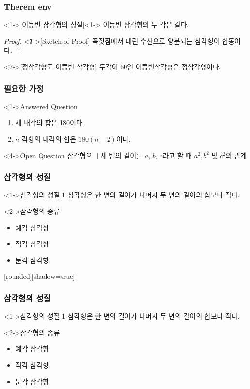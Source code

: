 \documentclass[xcolor=table]{beamer}
\begin{document}
\begin{frame}
\frametitle{Therem env}
\begin{theorem}<1->[이등변 삼각형의 성질]<1->
이등변 삼각형의 두 각은 같다.
\end{theorem}
\begin{proof}<3->[Sketch of Proof]
꼭짓점에서 내린 수선으로 양분되는 삼각형이 합동이다.
\end{proof}
\begin{example}<2->[정삼각형도 이등변 삼각형]
두각이 60인 이등변삼각형은 정삼각형이다.
\end{example}
\end{frame}

\begin{frame}
\frametitle{필요한 가정}
\begin{block}<1->{Answered Question}
\begin{enumerate}
\item<2-> 세 내각의 합은 180이다.
\item<3-> $n$ 각형의 내각의 합은 $180(n-2)$이다.
\end{enumerate}
\end{block}

\begin{block}<4->{Open Question}
삼각형으 ㅣ세 변의 길이를 $a$, $b$, $c$라고 할 때 $a^2, b^2$ 및 $c^2$의 관계
\end{block}
\end{frame}

\begin{frame}
\frametitle{삼각형의 성질}
\begin{block}<1->{삼각형의 성질 1}
\alert{삼각형}은 한 변의 길이가 나머지 두 변의 길이의 합보다 작다.
\end{block}

\begin{block}<2->{삼각형의 종류}
\begin{itemize}
\item<2-> 예각 삼각형
\item<3-> 직각 삼각형
\item<4-> 둔각 삼각형
\end{itemize}
\end{block}
\end{frame}

[rounded][shadow=true]

\begin{frame}
\frametitle{삼각형의 성질}
\begin{block}<1->{삼각형의 성질 1}
\alert{삼각형}은 한 변의 길이가 나머지 두 변의 길이의 합보다 작다.
\end{block}

\begin{block}<2->{삼각형의 종류}
\begin{itemize}
\item<2-> 예각 삼각형
\item<3-> 직각 삼각형
\item<4-> 둔각 삼각형
\end{itemize}
\end{block}
\end{frame}
\end{document}
